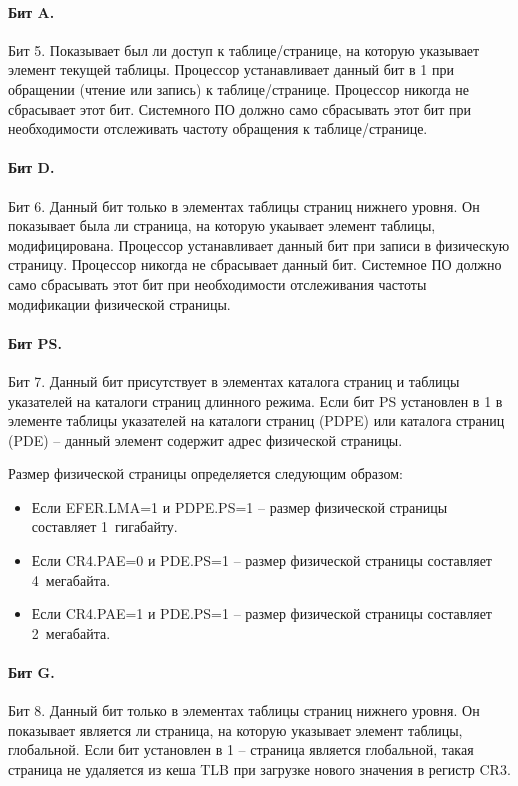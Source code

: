 \paragraph{Бит A.} Бит 5. Показывает был ли доступ к таблице/странице, на которую указывает элемент текущей таблицы.
Процессор устанавливает данный бит в 1 при обращении (чтение или запись) к таблице/странице. Процессор никогда не
сбрасывает этот бит. Системного ПО должно само сбрасывать этот бит при необходимости отслеживать частоту обращения к
таблице/странице.

\paragraph{Бит D.} Бит 6. Данный бит только в элементах таблицы страниц нижнего уровня. Он показывает была ли
страница, на которую укаывает элемент таблицы, модифицирована. Процессор устанавливает данный бит при записи в
физическую страницу. Процессор никогда не сбрасывает данный бит. Системное ПО должно само сбрасывать этот бит
при необходимости отслеживания частоты модификации физической страницы.

\paragraph{Бит PS.} Бит 7. Данный бит присутствует в элементах каталога страниц и таблицы указателей на каталоги
страниц длинного режима. Если бит PS установлен в 1 в элементе таблицы указателей на каталоги страниц (PDPE) или
каталога страниц (PDE) -- данный элемент содержит адрес физической страницы.

Размер физической страницы определяется следующим образом:
\begin{itemize}
\item Если EFER.LMA=1 и PDPE.PS=1 -- размер физической страницы составляет 1~гигабайту.
\item Если CR4.PAE=0 и PDE.PS=1 -- размер физической страницы составляет 4~мегабайта.
\item Если CR4.PAE=1 и PDE.PS=1 -- размер физической страницы составляет 2~мегабайта.
\end{itemize}

\paragraph{Бит G.} Бит 8. Данный бит только в элементах таблицы страниц нижнего уровня. Он показывает является
ли страница, на которую указывает элемент таблицы, глобальной. Если бит установлен в 1 -- страница является
глобальной, такая страница не удаляется из кеша TLB при загрузке нового значения в регистр CR3.

